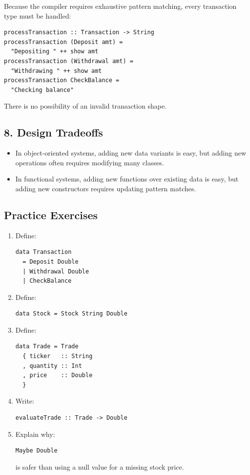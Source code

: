 \documentclass[12pt]{article}
\begin{document}
Because the compiler requires exhaustive pattern matching, every transaction type must be handled:

\begin{verbatim}
processTransaction :: Transaction -> String
processTransaction (Deposit amt) =
  "Depositing " ++ show amt
processTransaction (Withdrawal amt) =
  "Withdrawing " ++ show amt
processTransaction CheckBalance =
  "Checking balance"
\end{verbatim}

There is no possibility of an invalid transaction shape.

\subsection{8. Design Tradeoffs}

\begin{itemize}
  \item In object-oriented systems, adding new data variants is easy, but adding new operations often requires modifying many classes.
  \item In functional systems, adding new functions over existing data is easy, but adding new constructors requires updating pattern matches.
\end{itemize}

\subsection{Practice Exercises}

\begin{enumerate}
  \item Define:
        \begin{verbatim}
data Transaction
  = Deposit Double
  | Withdrawal Double
  | CheckBalance
\end{verbatim}

  \item Define:
        \begin{verbatim}
data Stock = Stock String Double
\end{verbatim}

  \item Define:
        \begin{verbatim}
data Trade = Trade
  { ticker   :: String
  , quantity :: Int
  , price    :: Double
  }
\end{verbatim}

  \item Write:
        \begin{verbatim}
evaluateTrade :: Trade -> Double
\end{verbatim}

  \item Explain why:
        \begin{verbatim}
Maybe Double
\end{verbatim}
        is safer than using a null value for a missing stock price.
\end{enumerate}
\end{document}
